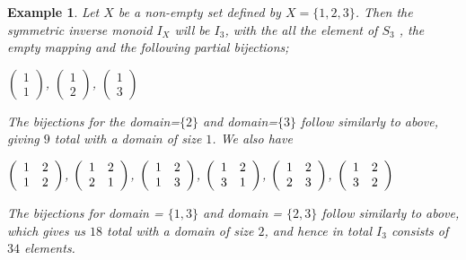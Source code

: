 \documentclass[12pt]{article}
\newtheorem{ex}[theorem]{Example}
\begin{document}
\begin{ex}\label{ex4.2}
	Let $X$ be a non-empty set defined by $X = \{1,2,3\}$. Then the symmetric inverse monoid $I_X$ will be $I_3$, with the all the element of $S_3$ , the empty mapping and the following partial bijections;
	\begin{center}
		$\left(
		\begin{array}{c}
		1  \\
		1 
		\end{array}
		\right)$,
		$\left(
		\begin{array}{c}
		1  \\
		2 
		\end{array}
		\right)$,
		$\left(
		\begin{array}{c}
		1  \\
		3 
		\end{array}
		\right)$
	\end{center}
	The bijections for the domain=$\{2\}$ and domain=$\{3\}$ follow similarly to above, giving $9$ total with a domain of size $1$. We also have
	\begin{center}
		$\left(
		\begin{array}{c c}
		1  & 2\\
		1  & 2
		\end{array}
		\right)$,
		$\left(
		\begin{array}{c c}
		1  & 2\\
		2  & 1
		\end{array}
		\right)$,
		$\left(
		\begin{array}{c c}
		1  & 2\\
		1  & 3
		\end{array}
		\right)$,
		$\left(
		\begin{array}{c c}
		1  & 2\\
		3  & 1
		\end{array}
		\right)$,
		$\left(
		\begin{array}{c c}
		1  & 2\\
		2  & 3
		\end{array}
		\right)$,
		$\left(
		\begin{array}{c c}
		1  & 2\\
		3  & 2
		\end{array}
		\right)$
	\end{center}
	The bijections for domain = $\{1,3\}$ and domain = $\{2,3\}$ follow similarly to above, which gives us $18$ total with a domain of size $2$, and hence in total $I_3$ consists of $34$ elements. 
\end{ex}
\end{document}
